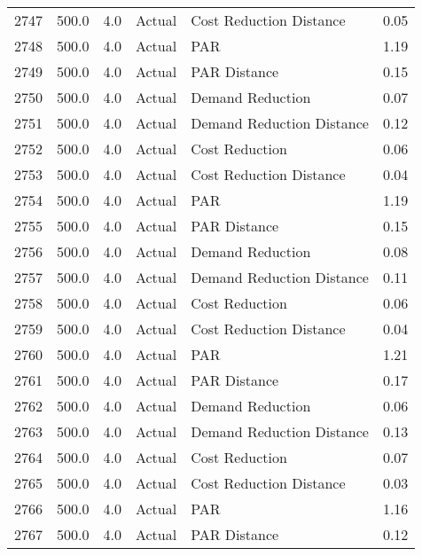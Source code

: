 \begin{longtable}{lrrllr}
2747 &        500.0 &     4.0 &         Actual &    Cost Reduction Distance &   0.05 \\
2748 &        500.0 &     4.0 &         Actual &                        PAR &   1.19 \\
2749 &        500.0 &     4.0 &         Actual &               PAR Distance &   0.15 \\
2750 &        500.0 &     4.0 &         Actual &           Demand Reduction &   0.07 \\
2751 &        500.0 &     4.0 &         Actual &  Demand Reduction Distance &   0.12 \\
2752 &        500.0 &     4.0 &         Actual &             Cost Reduction &   0.06 \\
2753 &        500.0 &     4.0 &         Actual &    Cost Reduction Distance &   0.04 \\
2754 &        500.0 &     4.0 &         Actual &                        PAR &   1.19 \\
2755 &        500.0 &     4.0 &         Actual &               PAR Distance &   0.15 \\
2756 &        500.0 &     4.0 &         Actual &           Demand Reduction &   0.08 \\
2757 &        500.0 &     4.0 &         Actual &  Demand Reduction Distance &   0.11 \\
2758 &        500.0 &     4.0 &         Actual &             Cost Reduction &   0.06 \\
2759 &        500.0 &     4.0 &         Actual &    Cost Reduction Distance &   0.04 \\
2760 &        500.0 &     4.0 &         Actual &                        PAR &   1.21 \\
2761 &        500.0 &     4.0 &         Actual &               PAR Distance &   0.17 \\
2762 &        500.0 &     4.0 &         Actual &           Demand Reduction &   0.06 \\
2763 &        500.0 &     4.0 &         Actual &  Demand Reduction Distance &   0.13 \\
2764 &        500.0 &     4.0 &         Actual &             Cost Reduction &   0.07 \\
2765 &        500.0 &     4.0 &         Actual &    Cost Reduction Distance &   0.03 \\
2766 &        500.0 &     4.0 &         Actual &                        PAR &   1.16 \\
2767 &        500.0 &     4.0 &         Actual &               PAR Distance &   0.12 \\

\end{longtable}
